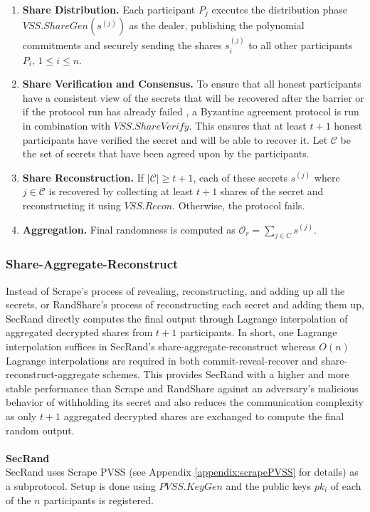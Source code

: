 \documentclass[letterpaper,twocolumn,10pt]{article}
\theoremstyle{definition}
\theoremstyle{remark}
\begin{document}
\begin{enumerate}
    \item \textbf{Share Distribution.} Each participant $P_j$ executes the distribution phase $VSS.ShareGen(s^{(j)})$ as the dealer, publishing the polynomial commitments and securely sending the shares $s_i^{(j)}$ to all other participants $P_i$, $1\le i\le n$.
    \item \textbf{Share Verification and Consensus.} To ensure that all honest participants have a consistent view of the secrets that will be recovered after the barrier or if the protocol run has already failed , a Byzantine agreement protocol is run in combination with $VSS.ShareVerify$. This ensures that at least $t+1$ honest participants have verified the secret and will be able to recover it. Let $\mathcal{C}$ be the set of secrets that have been agreed upon by the participants.
    \item \textbf{Share Reconstruction.} If $\lvert \mathcal{C} \rvert \ge t+1$, each of these secrets $s^{(j)}$ where $j \in \mathcal{C}$ is recovered by collecting at least $t+1$ shares of the secret and reconstructing it using $VSS.Recon$. Otherwise, the protocol fails.
    \item \textbf{Aggregation.} Final randomness is computed as $\mathcal{O}_r = \sum_{j \in C}s^{(j)}$.
    
\end{enumerate}

\subsubsection{Share-Aggregate-Reconstruct}
Instead of Scrape's process of revealing, reconstructing, and adding up all the secrets, or RandShare's process of reconstructing each secret and adding them up, SecRand directly computes the final output through Lagrange interpolation of aggregated decrypted shares from $t + 1$ participants. In short, one Lagrange interpolation suffices in SecRand's share-aggregate-reconstruct whereas $O(n)$ Lagrange interpolations are required in both commit-reveal-recover and share-reconstruct-aggregate schemes. This provides SecRand with a higher and more stable performance than Scrape and RandShare against an adversary's malicious behavior of withholding its secret and also reduces the communication complexity as only $t + 1$ aggregated decrypted shares are exchanged to compute the final random output.\\\\
\textbf{SecRand}\\
SecRand uses Scrape PVSS (see Appendix \ref{appendix:scrapePVSS} for details) as a subprotocol. Setup is done using $PVSS.KeyGen$ and the public keys $pk_i$ of each of the $n$ participants is registered. 
\end{document}
